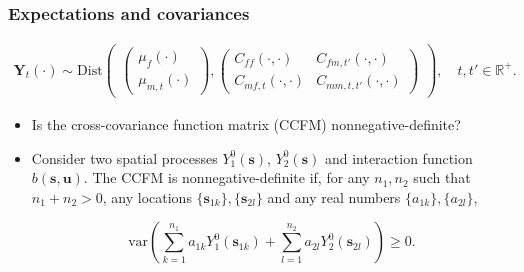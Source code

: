 \documentclass{beamer}
\newcommand{\svec} {\textbf{s}}
\newcommand{\uvec} {\textbf{u}}
\newcommand{\s}{\mathbf{s}}
\newcommand{\Yvec}{\mathbf{Y}}
\newcommand{\Zvec}{\mathbf{Z}}
\newcommand{\bSigma}{\bm{\Sigma}}
\newcommand{\var}{\mathrm{var}}
\newcommand{\Dist}{\mathrm{Dist}}
\newcommand{\ff} {\textit{ff}}
\begin{document}
\begin{frame}
\frametitle{Expectations and covariances}

\vspace{-0.2in}

\begin{align*}
\Yvec_t(\cdot) \sim \Dist\begin{pmatrix} \begin{pmatrix} \mu_f(\cdot) \\ \mu_{m,t}(\cdot) \end{pmatrix},\begin{pmatrix}  C_{\ff}(\cdot,\cdot) &  C_{fm,t'}(\cdot,\cdot) \\  C_{mf,t}(\cdot,\cdot) &  C_{mm,t,t'}(\cdot,\cdot) \end{pmatrix} \end{pmatrix},\quad t,t' \in \mathbb{R}^+.
\end{align*}

\begin{itemize}
\item \small Is the cross-covariance function matrix (CCFM) nonnegative-definite? \pause
\item \small Consider two spatial processes $Y_1^0(\svec)$, $Y_2^0(\svec)$ and interaction function $b(\svec,\uvec)$. The CCFM is nonnegative-definite if, for any $n_1,n_2$ such that $n_1 + n_2 > 0$, any locations $\{\svec_{1k}\}, \{\svec_{2l}\}$ and any real numbers $\{a_{1k}\},\{a_{2l}\}$,

\footnotesize
\begin{equation*}
 \var\left(\sum_{k=1}^{n_1}{a_{1k}Y_1^0(\s_{1k})}+\sum_{l=1}^{n_2}{a_{2l}Y_2^0(\s_{2l})}\right)  \ge 0.
\end{equation*}


\end{itemize}
\end{frame}
\end{document}
